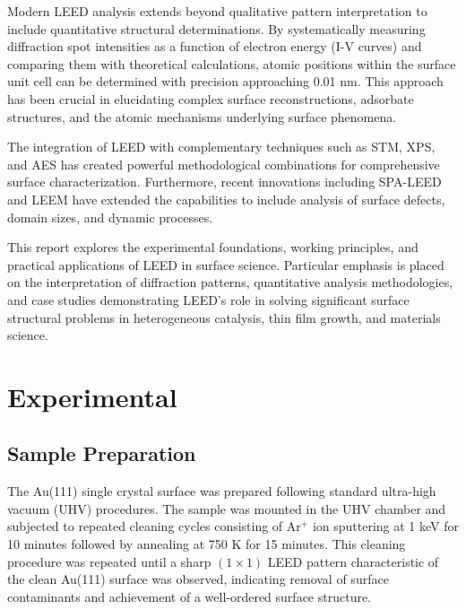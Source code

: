 \documentclass[fontsize=11pt,reqno,a4paper,oneside]{scrartcl}
\begin{document}
Modern \ac{LEED} analysis extends beyond qualitative pattern interpretation to include quantitative structural determinations. By systematically measuring diffraction spot intensities as a function of electron energy (I-V curves) and comparing them with theoretical calculations, atomic positions within the surface unit cell can be determined with precision approaching 0.01 nm. This approach has been crucial in elucidating complex surface reconstructions, adsorbate structures, and the atomic mechanisms underlying surface phenomena\supercite{Heinz1995}.

The integration of \ac{LEED} with complementary techniques such as \ac{STM}, \ac{XPS}, and \ac{AES} has created powerful methodological combinations for comprehensive surface characterization\supercite{Fadley2010}. Furthermore, recent innovations including \ac{SPA-LEED} and \ac{LEEM} have extended the capabilities to include analysis of surface defects, domain sizes, and dynamic processes\supercite{Henzler1991}.

This report explores the experimental foundations, working principles, and practical applications of \ac{LEED} in surface science. Particular emphasis is placed on the interpretation of diffraction patterns, quantitative analysis methodologies, and case studies demonstrating \ac{LEED}'s role in solving significant surface structural problems in heterogeneous catalysis, thin film growth, and materials science.

\clearpage
\section{Experimental}


\subsection{Sample Preparation}

The Au(111) single crystal surface was prepared following standard ultra-high vacuum (UHV) procedures. The sample was mounted in the UHV chamber and subjected to repeated cleaning cycles consisting of Ar$^+$ ion sputtering at 1 keV for 10 minutes followed by annealing at 750 K for 15 minutes. This cleaning procedure was repeated until a sharp $(1 \times 1)$ LEED pattern characteristic of the clean Au(111) surface was observed, indicating removal of surface contaminants and achievement of a well-ordered surface structure.
\end{document}
